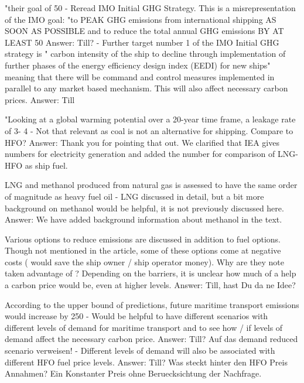 "their goal of 50%
-	Reread IMO Initial GHG Strategy. This is a misrepresentation of the IMO goal: "to PEAK GHG emissions from international shipping AS SOON AS POSSIBLE and to reduce the total annual GHG emissions BY AT LEAST 50%
Answer: Till?
-	Further target number 1 of the IMO Initial GHG strategy is " carbon intensity of the ship to decline through implementation of further phases of the energy efficiency design index (EEDI) for new ships" meaning that there will be command and control measures implemented in parallel to any market based mechanism. This will also affect necessary carbon prices. 
Answer: Till

"Looking at a global warming potential over a 20-year time frame, a leakage rate of 3- 4 %
-	Not that relevant as coal is not an alternative for shipping. Compare to HFO?
Answer: Thank you for pointing that out. We clarified that IEA gives numbers for electricity generation and added the number for comparison of LNG-HFO as ship fuel.

LNG and methanol produced from natural gas is assessed to have the same order of magnitude as heavy fuel oil
-	LNG discussed in detail, but a bit more background on methanol would be helpful, it is not previously discussed here.
Answer: We have added background information about methanol in the text.

Various options to reduce emissions are discussed in addition to fuel options. Though not mentioned in the article, some of these options come at negative costs ( would save the ship owner / ship operator money). Why are they note taken advantage of ? Depending on the barriers, it is unclear how much of a help a carbon price would be, even at higher levels.
Answer: Till, hast Du da ne Idee?
 
According to the upper bound of predictions, future maritime transport emissions would increase by 250%
-	Would be helpful to have different scenarios with different levels of demand for maritime transport and to see how / if levels of demand affect the necessary carbon price.
Answer: Till? Auf das demand reduced scenario verweisen!
-	Different levels of demand will also be associated with different HFO fuel price levels.
Answer: Till? Was steckt hinter den HFO Preis Annahmen? Ein Konstanter Preis ohne Beruecksichtung der Nachfrage.

